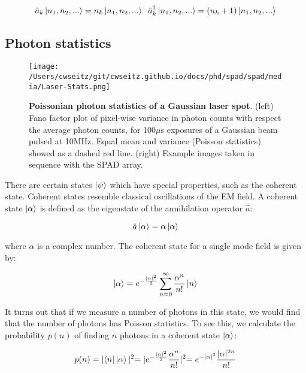 \begin{equation*}
\hat{a}_k \ket{n_1, n_2, ...} = n_k \ket{n_1, n_2, ...} \;\;
\hat{a}_k^\dagger \ket{n_1, n_2, ...} = (n_k +1) \ket{n_1, n_2, ...}
\end{equation*}

\subsection{Photon statistics}

\begin{figure*}[t]
\centering
\texttt{[image: /Users/cwseitz/git/cwseitz.github.io/docs/phd/spad/spad/media/Laser-Stats.png]}
\caption{\textbf{Poissonian photon statistics of a Gaussian laser spot}. (left) Fano factor plot of pixel-wise variance in photon counts with respect the average photon counts, for 100$\mu$s exposures of a Gaussian beam pulsed at 10MHz. Equal mean and variance (Poisson statistics) showed as a dashed red line. (right) Example images taken in sequence with the SPAD array.}
\label{fig:fig29}
\end{figure*}    

There are certain states $\ket{\psi}$ which have special properties, such as the coherent state. Coherent states resemble classical oscillations of the EM field. A coherent state $\ket{\alpha}$ is defined as the eigenstate of the annihilation operator $\hat{a}$:

\begin{equation*}
\hat{a} \ket{\alpha} = \alpha \ket{\alpha}
\end{equation*}

where $\alpha$ is a complex number. The coherent state for a single mode field is given by:

\begin{equation*}
\ket{\alpha} = e^{-\frac{\lvert\alpha\lvert^2}{2}} \sum_{n=0}^\infty \frac{\alpha^n}{n!} \ket{n}
\end{equation*}

It turns out that if we measure a number of photons in this state, we would find that the number of photons has Poisson statistics. To see this, we calculate the probability $p(n)$ of finding $n$ photons in a coherent state $\ket{\alpha}$:

\begin{equation*}
p(n) = \lvert \bra{n} \ket{\alpha} \lvert^2 = \lvert e^{-\frac{\lvert\alpha\lvert^2}{2}} \frac{\alpha^n}{n!} \lvert^2 = e^{-\lvert\alpha\lvert^2} \frac{\lvert\alpha\lvert^{2n}}{n!}
\end{equation*}

